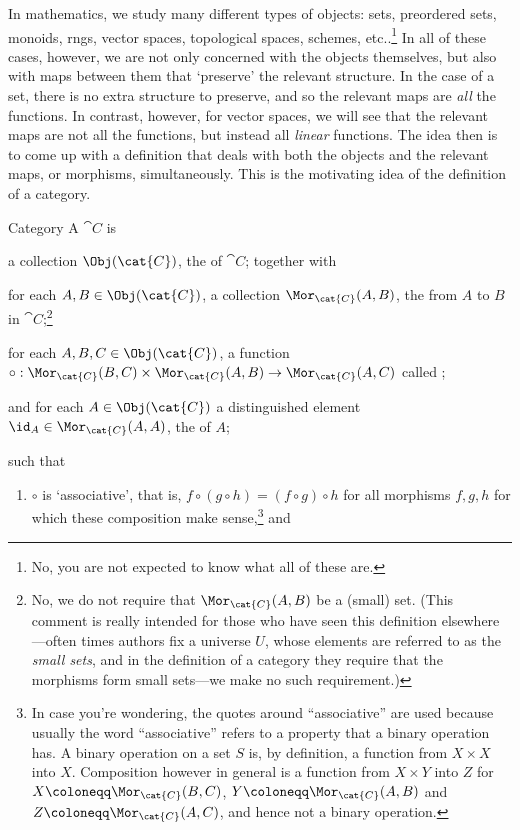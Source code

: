 In mathematics, we study many different types of objects:  sets, preordered sets, monoids, rngs, vector spaces, topological spaces, schemes, etc..\footnote{No, you are not expected to know what all of these are.}  In all of these cases, however, we are not only concerned with the objects themselves, but also with maps between them that `preserve' the relevant structure.  In the case of a set, there is no extra structure to preserve, and so the relevant maps are \emph{all} the functions.  In contrast, however, for vector spaces, we will see that the relevant maps are not all the functions, but instead all \emph{linear} functions.  The idea then is to come up with a definition that deals with both the objects and the relevant maps, or morphisms, simultaneously.  This is the motivating idea of the definition of a category.
\begin{dfn}{Category}{}
A  $\cat{C}$ is
\begin{data}
\item a collection $\Obj (\cat{C})$, the  of $\cat{C}$; together with
\item for each $A,B\in \Obj (\cat{C})$, a collection $\Mor _{\cat{C}}(A,B)$, the  from $A$ to $B$ in $\cat{C}$;\footnote{No, we do not require that $\Mor _{\cat{C}}(A,B)$ be a (small) set.  (This comment is really intended for those who have seen this definition elsewhere---often times authors fix a universe $U$, whose elements are referred to as the \emph{small sets}, and in the definition of a category they require that the morphisms form small sets---we make no such requirement.)}
\item for each $A,B,C\in \Obj (\cat{C})$, a function $\circ :\Mor _{\cat{C}}(B,C)\times \Mor _{\cat{C}}(A,B)\rightarrow \Mor _{\cat{C}}(A,C)$ called ;
\item and for each $A\in \Obj (\cat{C})$ a distinguished element $\id _{A}\in \Mor _{\cat{C}}(A,A)$, the  of $A$;
\end{data}
such that
\begin{enumerate}
\item $\circ$ is `associative', that is, $f\circ (g\circ h)=(f\circ g)\circ h$ for all morphisms $f,g,h$ for which these composition make sense,\footnote{In case you're wondering, the quotes around ``associative'' are used because usually the word ``associative'' refers to a property that a binary operation has.  A binary operation on a set $S$ is, by definition, a function from $X\times X$ into $X$.  Composition however in general is a function from $X\times Y$ into $Z$ for $X\coloneqq \Mor _{\cat{C}}(B,C)$, $Y\coloneqq \Mor _{\cat{C}}(A,B)$ and $Z\coloneqq \Mor _{\cat{C}}(A,C)$, and hence not a binary operation.} and

\end{enumerate}
\end{dfn}
